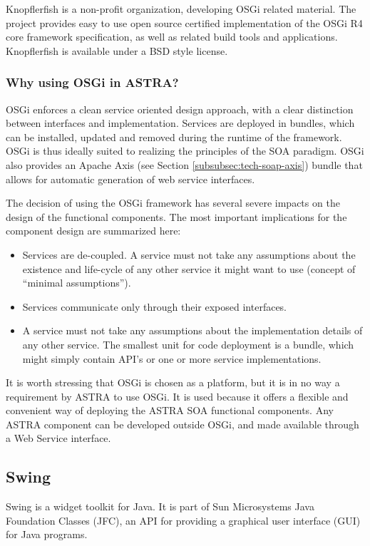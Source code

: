 Knopflerfish is a non-profit organization, developing OSGi related material. 
The project provides easy to use open source certified implementation of the OSGi R4 core 
framework specification, as well as related build tools and applications. 
Knopflerfish is available under a BSD style license.

\subsubsection{Why using OSGi in ASTRA?}
OSGi enforces a clean service oriented design approach, with a clear
distinction between interfaces and implementation. 
Services are deployed in bundles, which can be installed, updated and removed
during the runtime of the framework. OSGi is thus ideally suited to realizing
the principles of the SOA paradigm. OSGi also provides an Apache Axis (see
Section \ref{subsubsec:tech-soap-axis}) bundle that allows for automatic 
generation of web service interfaces.

The decision of using the OSGi framework has several severe impacts on the
design  of the functional components.
The most important implications for the component design are summarized here:
\begin{itemize}
	\item Services are de-coupled. A service must not take any assumptions about
the existence and life-cycle of any other service it might want to use (concept
of ``minimal assumptions'').
	\item Services communicate only through their exposed interfaces.
	\item A service must not take any assumptions about the implementation details
	of any other service. 
	The smallest unit for code deployment is a bundle, which might simply contain 
	API's or one or more service implementations.
\end{itemize}

It is worth stressing that OSGi is chosen as a platform, but it is
in no way a requirement by ASTRA to use OSGi. It is used because it offers a
flexible and convenient way of deploying the ASTRA SOA functional components. 
Any ASTRA component can be developed outside OSGi, and made available through a
Web Service interface.

\subsection{Swing}
Swing is a widget toolkit for Java. It is part of Sun Microsystems Java
Foundation Classes (JFC), an API for providing a graphical user interface (GUI)
for Java programs.

